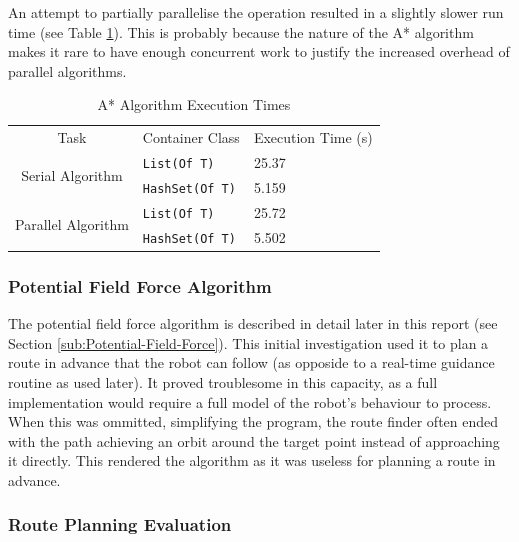 \documentclass[10pt]{article}
\begin{document}
An attempt to partially parallelise the operation resulted in a slightly slower
run time (see Table \ref{tab:aStarTimingsTable}). This is probably because the
nature of the A* algorithm makes it rare to have enough concurrent work to
justify the increased overhead of parallel algorithms.

\begin{singlespace}
\begin{table}
\centering%
\begin{tabular}{|c|m{3cm}|p{2cm}|}
\hline
\multirow{2}{*}{Task} & \multirow{2}{3cm}{Container Class} &
\multirow{2}{2cm}{Execution Time (\si{\second})} \\
 &  & \\
\hline
\multirow{2}{*}{Serial Algorithm} & \texttt{List(Of T)} & \num{25.37}
\\
\cline{2-3}
 & \texttt{HashSet(Of T)} & \num{5.159} \\
\hline
\multirow{2}{*}{Parallel Algorithm} & \texttt{List(Of T)} & \num{25.72}
\\
\cline{2-3}
 & \texttt{HashSet(Of T)} & \num{5.502} \\
\hline
\end{tabular}

\caption{A* Algorithm Execution Times\label{tab:aStarTimingsTable}}
\end{table}

\end{singlespace}

\subsubsection{Potential Field Force Algorithm}

The potential field force algorithm is described in detail later in this report
(see Section \ref{sub:Potential-Field-Force}).  This initial investigation used
it to plan a route in advance that the robot can follow (as opposide to a
real-time guidance routine as used later).  It proved troublesome in this
capacity, as a full implementation would require a full model of the robot's
behaviour to process.  When this was ommitted, simplifying the program, the
route finder often ended with the path achieving an orbit around the target
point instead of approaching it directly.  This rendered the algorithm as it was
useless for planning a route in advance.

\subsubsection{Route Planning Evaluation}
\end{document}
